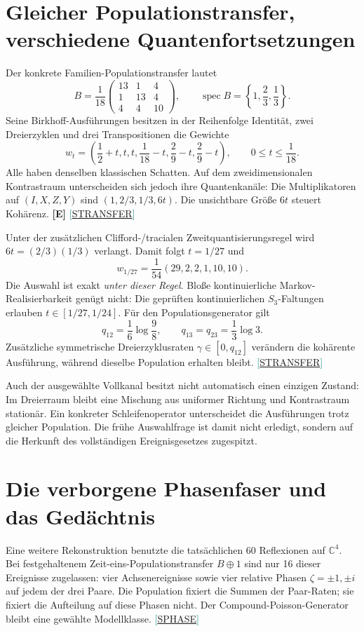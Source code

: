\documentclass[11pt,a4paper,oneside,parskip=half,headings=normal,numbers=noenddot,bibliography=totoc]{scrreprt}
\newcommand{\C}{\mathbb C}
\newcommand{\spec}{\operatorname{spec}}
\newcommand{\src}[1]{\textcolor{teal}{\small[\hyperref[s:#1]{S#1}]}}
\newcommand{\st}[1]{\textsf{\textbf{[#1]}}}
\begin{document}
\section{Gleicher Populationstransfer, verschiedene Quantenfortsetzungen}
Der konkrete Familien-Populationstransfer lautet
\[
 B=\frac1{18}\begin{pmatrix}13&1&4\\1&13&4\\4&4&10\end{pmatrix},
 \qquad\spec B=\left\{1,\frac23,\frac13\right\}.
\]
Seine Birkhoff-Ausführungen besitzen in der Reihenfolge Identität, zwei Dreierzyklen und drei Transpositionen die Gewichte
\[
 w_t=\left(\frac12+t,t,t,\frac1{18}-t,\frac29-t,\frac29-t\right),
 \qquad0\le t\le\frac1{18}.
\]
Alle haben denselben klassischen Schatten. Auf dem zweidimensionalen Kontrastraum unterscheiden sich jedoch ihre Quantenkanäle: Die Multiplikatoren auf $(I,X,Z,Y)$ sind $(1,2/3,1/3,6t)$. Die unsichtbare Größe $6t$ steuert Kohärenz. \st{E} \src{TRANSFER}

Unter der zusätzlichen Clifford-/tracialen Zweitquantisierungsregel wird $6t=(2/3)(1/3)$ verlangt. Damit folgt $t=1/27$ und
\[
 w_{1/27}=\frac1{54}(29,2,2,1,10,10).
\]
Die Auswahl ist exakt \emph{unter dieser Regel}. Bloße kontinuierliche Markov-Realisierbarkeit genügt nicht: Die geprüften kontinuierlichen $S_3$-Faltungen erlauben $t\in[1/27,1/24]$. Für den Populationsgenerator gilt
\[
 q_{12}=\frac16\log\frac98,\qquad
 q_{13}=q_{23}=\frac13\log3.
\]
Zusätzliche symmetrische Dreierzyklusraten $\gamma\in[0,q_{12}]$ verändern die kohärente Ausführung, während dieselbe Population erhalten bleibt. \src{TRANSFER}

Auch der ausgewählte Vollkanal besitzt nicht automatisch einen einzigen Zustand: Im Dreierraum bleibt eine Mischung aus uniformer Richtung und Kontrastraum stationär. Ein konkreter Schleifenoperator unterscheidet die Ausführungen trotz gleicher Population. Die frühe Auswahlfrage ist damit nicht erledigt, sondern auf die Herkunft des vollständigen Ereignisgesetzes zugespitzt.

\section{Die verborgene Phasenfaser und das Gedächtnis}
Eine weitere Rekonstruktion benutzte die tatsächlichen 60 Reflexionen auf $\C^4$. Bei festgehaltenem Zeit-eins-Populationstransfer $B\oplus1$ sind nur 16 dieser Ereignisse zugelassen: vier Achsenereignisse sowie vier relative Phasen $\zeta=\pm1,\pm i$ auf jedem der drei Paare. Die Population fixiert die Summen der Paar-Raten; sie fixiert die Aufteilung auf diese Phasen nicht. Der Compound-Poisson-Generator bleibt eine gewählte Modellklasse. \src{PHASE}
\end{document}
